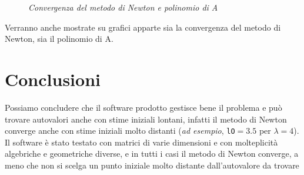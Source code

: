 \documentclass[12pt]{article}
\begin{document}
    \begin{figure}[htbp]
            \caption{\textit{Convergenza del metodo di Newton e polinomio di A}}
    \end{figure}
Verranno anche mostrate su grafici apparte sia la convergenza del metodo di Newton, sia il polinomio di A.

    \section{Conclusioni}
    Possiamo concludere che il software prodotto gestisce bene il problema e può trovare autovalori anche con stime iniziali lontani, infatti il metodo di Newton converge anche con stime iniziali molto distanti (\textit{ad esempio}, \texttt{lO}$= 3.5$ per $\lambda = 4$). \\ 
    Il software è stato testato con matrici di varie dimensioni e con molteplicità algebriche e geometriche diverse, e in tutti i casi il metodo di Newton converge, a meno che non si scelga un punto iniziale molto distante dall'autovalore da trovare\\
\end{document}
